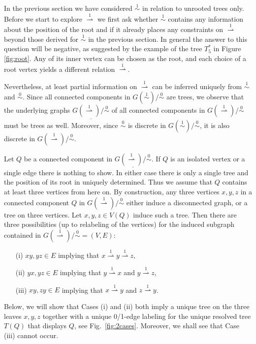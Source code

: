 \documentclass[smallextended]{svjour3}
\newcommand{\TODO}[1]{\begingroup\color{red}#1\endgroup}
\newcommand{\Ro}{\mathrel{\overset{0}{\sim}}}
\newcommand{\Rl}{\mathrel{\overset{1}{\sim}}}
\newcommand{\Rld}{\mathrel{\overset{1}{\rightharpoonup}}}
\begin{document}
In the previous section we have considered $\Rl$ in relation to unrooted
trees only. Before we start to explore $\Rld$ we first ask whether $\Rl$
contains any information about the position of the root and if it already
places any constraints on $\Rld$ beyond those derived for $\Rl$ in the
previous section. In general the answer to this question will be negative,
as suggested by the example of the tree $T_5^*$ in Figure
\ref{fig:root}. Any of its inner vertex can be chosen as the root, and
each choice of a root vertex yields a different relation $\Rld$.

Nevertheless, at least partial information on $\Rld$ can be inferred
uniquely from $\Rl$ and $\Ro$. Since all connected components in
$G(\Rl)/\Ro$ are trees, we observe that the underlying graphs
$\underline{G(\Rld)/\Ro}$ of all connected components in $G(\Rld)/\Ro$ must
be trees as well.  Moreover, since $\Ro$ is discrete in $G(\Rl)/\Ro$, it is
also discrete in $G(\Rld)/\Ro$.

Let $Q$ be a connected component in $\underline{G(\Rld)/\Ro}$.  \TODO{If
  $Q$ is an isolated vertex or a single edge there is nothing to show.} In
either case there is only a single tree and the position of its root in
uniquely determined. Thus we assume that $Q$ contains at least three
vertices from here on. By construction, any three vertices $x,y,z$ in a
connected component $Q$ in $G(\Rld)/\Ro$ either induce a disconnected
graph, or a tree on three vertices.  Let $x,y,z\in V(Q)$ induce such a
tree. Then there are three possibilities (up to relabeling of the vertices)
for the induced subgraph contained in $G(\Rld)/\Ro = (V,E)$:
\begin{itemize}
\item[(i)] $xy, yz \in E$ implying that $x\Rld y \Rld z$, 
\item[(ii)] $yx, yz \in E$ implying that $y\Rld x$ and $y \Rld z$,
\item[(iii)] $xy, zy \in E$ implying that $x\Rld y$ and $z \Rld y$. 
\end{itemize}
Below, we will show that Cases (i) and (ii) both imply a unique tree on the
three leaves $x,y,z$ together with a unique 0/1-edge labeling for the
unique resolved tree $T(Q)$ that displays $Q$, see Fig.\
\ref{fig:2cases}. Moreover, we shall see that Case (iii) cannot occur.
\end{document}
